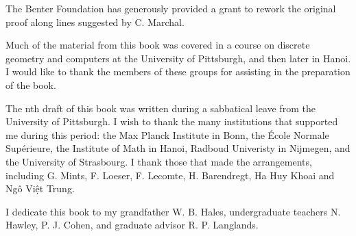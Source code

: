 The Benter Foundation has generously provided a grant to rework the original
proof along lines suggested by C. Marchal.

Much of the material from this book was covered
in a course on discrete geometry and computers at the University of
Pittsburgh, and then later %
in Hanoi.  I would like to thank the members of these
groups for assisting in the preparation of the book.

The nth draft of this book was written during a sabbatical leave from the
University of Pittsburgh.  I wish to thank the many institutions that
supported me during this period: the Max Planck Institute in Bonn, the
\'Ecole Normale Sup\'erieure, the Institute of Math in Hanoi, Radboud
Univeristy in Nijmegen, and the University of Strasbourg.  I thank
those that made the arrangements, including G. Mints, F. Loeser,
F. Lecomte, H. Barendregt, Ha Huy Khoai and Ng\^o Vi\d{\^e}t Trung.

I dedicate this book to my grandfather W. B. Hales, undergraduate
teachers N. Hawley, P. J. Cohen, and graduate advisor R. P. Langlands.

